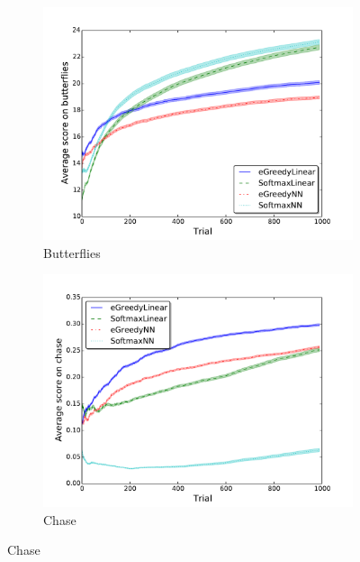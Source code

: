 \documentclass[conference]{IEEEtran}
\begin{document}
\begin{figure}[!t]
\begin{center}
\begin{subfigure} {\lefig\textwidth}
	\includegraphics[width = \textwidth]{img/butterflies_scores}
  \caption{Butterflies}
\end{subfigure}\begin{subfigure} {\lefig\textwidth}
	\includegraphics[width = \textwidth]{img/chase_scores}
  \caption{Chase}
  \end{subfigure}


\end{center}
\end{figure}
\end{document}
